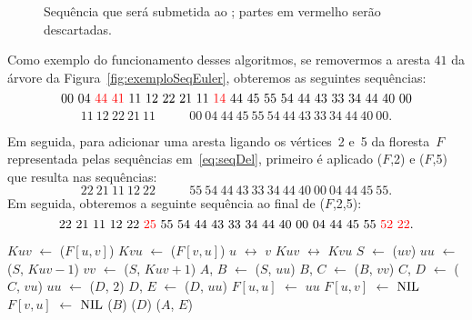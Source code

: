 \begin{figure}[htb]
\centering

\caption{Sequência que será submetida ao \dymForestDelEdge{}; partes em vermelho serão descartadas.}
\label{fig:algorit-cut-seqxy}
\end{figure}

Como exemplo do funcionamento desses algoritmos, se removermos a aresta $41$ da árvore da Figura~\ref{fig:exemploSeqEuler}, obteremos as seguintes sequências:
\begin{equation}
00~04~{\color{red} 44~41}~11~12~22~21~11~{\color{red} 14}~44~45~55~54~44~43~33~34~44~40~00\nonumber
\end{equation}
\begin{equation}
11~12~22~21~11~~~~~~~~~~~~00~04~44~45~55~54~44~43~33~34~44~40~00.\label{eq:seqDel}
\end{equation}

Em seguida, para adicionar uma aresta ligando os vértices~2 e~5 da floresta~$F$ representada pelas sequências em~\eqref{eq:seqDel}, primeiro é aplicado \ETmovetofront($F$,2) e \ETmovetofront($F$,5) que resulta nas sequências:
\begin{equation}
22~21~11~12~22   ~~~~~~~~~~~~55~54~44~43~33~34~44~40~00~04~44~45~55.\nonumber
\end{equation}%
Em seguida, obteremos a seguinte sequência ao final de \ETTAddEdge($F$,2,5):
\begin{equation}
22~21~11~12~22~{\color{red} 25}~55~54~44~43~33~34~44~40~00~04~44~45~55~{\color{red} 52~22}.\nonumber
\end{equation}%

\begin{algorithm}[htb]
\caption{\dymForestDelEdge($F$, $u$, $v$)}
\label{Algo:dymForestDelEdge}
\begin{algorithmic}[1]
\State $Kuv$ $\gets$ \treapOrder($F[u,v]$)
\State $Kvu$ $\gets$ \treapOrder($F[v,u]$) 
	\State $u$ $\leftrightarrow$ $v$
	\State $Kuv$ $\leftrightarrow$ $Kvu$
\EndIf
\State $S$ $\gets$ \treapGetRoot($uv$)
\State $uu$ $\gets$ \treapSearch($S$, $Kuv-1$)
\State $vv$ $\gets$ \treapSearch($S$, $Kuv+1$)
\State $A$, $B$ $\gets$ \treapSplit($S$, $uu$)
\State $B$, $C$ $\gets$ \treapSplit($B$, $vv$)
\State $C$, $D$ $\gets$ \treapSplit($C$, $vu$)
\State $uu$ $\gets$ \treapSearch($D$, $2$)
\State $D$, $E$ $\gets$ \treapSplit($D$, $uu$)
\State $F[u,u]$ $\gets$ $uu$
\State $F[u,v]$ $\gets$ $\text{NIL}{}$
\State $F[v,u]$ $\gets$ $\text{NIL}{}$
\State \free($B$)
\State \free($D$)
\State \treapJoin($A$, $E$)
\end{algorithmic}
\end{algorithm}





